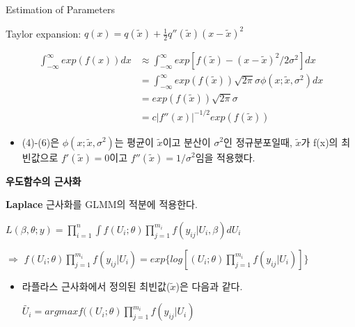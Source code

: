\documentclass[9pt, xelatex]{beamer}
\begin{document}
{\begin{frame}[allowframebreaks]{Estimation of Parameters}
		\begin{center}
			Taylor expansion: $q(x)=q(\tilde{x})+\frac{1}{2}q''(\tilde{x})(x-\tilde{x})^{2}$
			
			\begin{align}
				\int^{\infty}_{-\infty} exp(f(x))dx & \approx \int^{\infty}_{-\infty} exp[{f(\tilde{x})-(x-\tilde{x})^{2}}/{2\sigma^{2}}]dx \\
				& =\int^{\infty}_{-\infty}exp(f({\tilde{x}}))\sqrt{2\pi}\sigma\phi(x;\tilde{x},\sigma^{2})dx \\ 
				& =exp(f(\tilde{x}))\sqrt{2\pi}\sigma \\
				& = c|f''(x)|^{-1/2}exp(f(\tilde{x}))
			\end{align}	
		\end{center}
		
		\begin{itemize}
			\item (4)-(6)은 $\phi(x;\tilde{x},\sigma^{2})$는 평균이 $\tilde{x}$이고 분산이 $\sigma^{2}$인 정규분포일때, $\tilde{x}$가 f(x)의 최빈값으로 $f'(\tilde{x})=0$이고 $f''(\tilde{x})=1/\sigma^{2}$임을 적용했다.
			
		\end{itemize}
		\framebreak
		\textbf{우도함수의 근사화}
		\vspace{4mm}
		
		\textbf{Laplace} 근사화를 GLMM의 적분에 적용한다.
		\vspace{2mm}
		
		\begin{center}
			$L(\beta,\theta; y)=\prod_{i=1}^{n}\int f(U_{i};\theta)\prod_{j=1}^{m_{i}} f(y_{ij}|U_{i},\beta)dU_{i}$
			\vspace{3mm}
			
			$\Rightarrow$
			$f(U_{i};\theta)\prod_{j=1}^{m_{i}} f(y_{ij}|U_{i}) = exp\{log[(U_{i};\theta)\prod_{j=1}^{m_{i}} f(y_{ij}|U_{i})]\}$
		\end{center}
		\vspace{4mm}
		
		\begin{itemize}
			
			\item 라플라스 근사화에서 정의된 최빈값($\tilde{x}$)은 다음과 같다.
			\vspace{1mm}
			
			\begin{center}
				$\tilde{U_{i}}=argmax{f((U_{i};\theta)\prod_{j=1}^{m_{i}} f(y_{ij}|U_{i})}$
			\end{center}
			\vspace{1mm}
			

\end{itemize}
\end{frame}}
\end{document}
